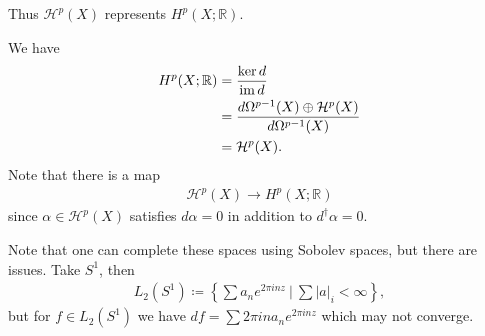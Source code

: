\begin{corollary}[?]

Thus \(\mathcal{H}^p(X)\) represents \(H^p(X; {\mathbb{R}})\).

\end{corollary}

\begin{remark}

We have
\begin{align*}
H^p(X; {\mathbb{R}}) 
&= {\ker d \over \operatorname{im}d} \\
&= { d \Omega^{p-1}(X) \oplus \mathcal{H}^p(X) \over d \Omega^{p-1}(X) } \\
&= \mathcal{H}^p(X) 
.\end{align*}
Note that there is a map
\begin{align*}
\mathcal{H}^p(X) \to H^p(X; {\mathbb{R}}) 
\end{align*}
since \(\alpha\in \mathcal{H}^p(X)\) satisfies \(d \alpha = 0\) in
addition to \(d^\dagger \alpha = 0\).

\end{remark}

\begin{remark}

Note that one can complete these spaces using Sobolev spaces, but there
are issues. Take \(S^1\), then
\begin{align*}
L_2(S^1) \coloneqq\left\{{ \sum a_n e^{2\pi i n z} {~\mathrel{\Big|}~}\sum {\left\lvert {a} \right\rvert}_i < \infty  }\right\}
,\end{align*}
but for \(f\in L_2(S^1)\) we have
\(df = \sum 2\pi i n a_n e^{2\pi i n z}\) which may not converge.

\end{remark}

\cleardoublepage

\renewcommand{\listtheoremname}{}
\listoftheorems[ignoreall,show={definition}, numwidth=3.5em]
\cleardoublepage

\renewcommand{\listtheoremname}{}
\listoftheorems[ignoreall,show={theorem,proposition}, numwidth=3.5em]
\cleardoublepage

\renewcommand{\listtheoremname}{}
\listoftheorems[ignoreall,show={exercise}, numwidth=3.5em]
\cleardoublepage

\listoffigures
\cleardoublepage


\printbibliography[title=Bibliography]



